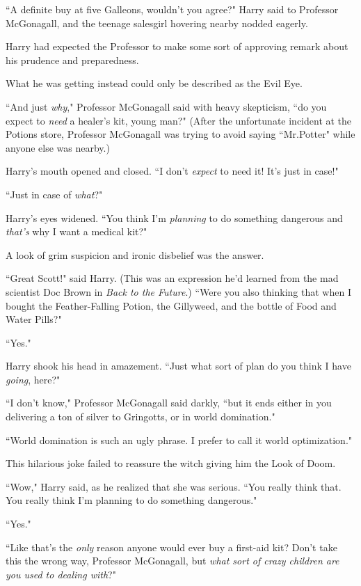 ``A definite buy at five Galleons, wouldn't you agree?" Harry said to Professor McGonagall, and the teenage salesgirl hovering nearby nodded eagerly.

Harry had expected the Professor to make some sort of approving remark about his prudence and preparedness.

What he was getting instead could only be described as the Evil Eye.

``And just \emph{why}," Professor McGonagall said with heavy skepticism, ``do you expect to \emph{need} a healer's kit, young man?" (After the unfortunate incident at the Potions store, Professor McGonagall was trying to avoid saying ``Mr.\?Potter" while anyone else was nearby.)

Harry's mouth opened and closed. ``I don't \emph{expect} to need it! It's just in case!"

``Just in case of \emph{what}?"

Harry's eyes widened. ``You think I'm \emph{planning} to do something dangerous and \emph{that's} why I want a medical kit?"

A look of grim suspicion and ironic disbelief was the answer.

``Great Scott!" said Harry. (This was an expression he'd learned from the mad scientist Doc Brown in \emph{Back to the Future}.) ``Were you also thinking that when I bought the Feather-Falling Potion, the Gillyweed, and the bottle of Food and Water Pills?"

``Yes."

Harry shook his head in amazement. ``Just what sort of plan do you think I have \emph{going}, here?"

``I don't know," Professor McGonagall said darkly, ``but it ends either in you delivering a ton of silver to Gringotts, or in world domination."

``World domination is such an ugly phrase. I prefer to call it world optimization."

This hilarious joke failed to reassure the witch giving him the Look of Doom.

``Wow," Harry said, as he realized that she was serious. ``You really think that. You really think I'm planning to do something dangerous."

``Yes."

``Like that's the \emph{only} reason anyone would ever buy a first-aid kit? Don't take this the wrong way, Professor McGonagall, but \emph{what sort of crazy children are you used to dealing with}?"

